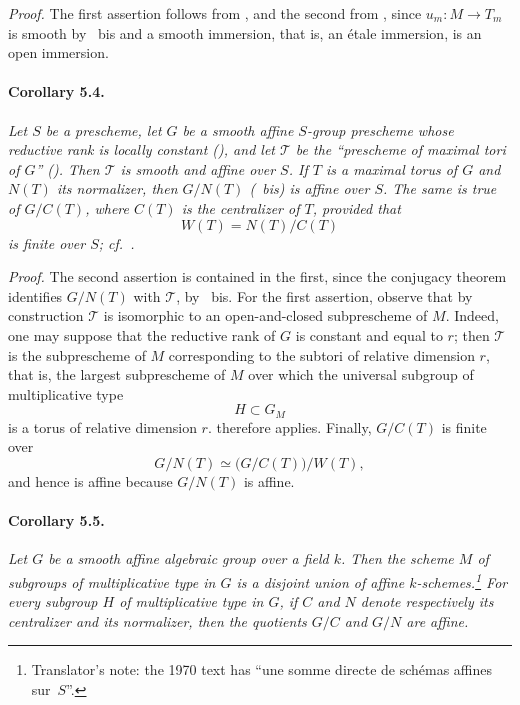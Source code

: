 \emph{Proof.}
The first assertion follows from , and the second from ,
since \(u_m:M\to T_m\) is smooth by ~bis and a smooth
immersion, that is, an étale immersion, is an open immersion.

\paragraph{\textbf{Corollary 5.4.}}
\emph{Let \(S\) be a prescheme, let \(G\) be a smooth affine
\(S\)-group prescheme whose reductive rank is locally constant
\textup{()}, and let \(\mathcal T\) be the ``prescheme of
maximal tori of \(G\)'' \textup{()}. Then \(\mathcal T\) is
smooth and affine over \(S\). If \(T\) is a maximal torus of \(G\)
and \(N(T)\) its normalizer, then \(G/N(T)\) \textup{(~bis)}
is affine over \(S\). The same is true of \(G/C(T)\), where \(C(T)\)
is the centralizer of \(T\), provided that
\[
  W(T)=N(T)/C(T)
\]
is finite over \(S\); cf.\ .}

\emph{Proof.}
The second assertion is contained in the first, since the conjugacy
theorem identifies \(G/N(T)\) with \(\mathcal T\), by ~bis.
For the first assertion, observe that by construction
\(\mathcal T\) is isomorphic to an open-and-closed subprescheme of
\(M\). Indeed, one may suppose that the reductive rank of \(G\) is
constant and equal to \(r\); then \(\mathcal T\) is the subprescheme
of \(M\) corresponding to the subtori of relative dimension \(r\),
that is, the largest subprescheme of \(M\) over which the universal
subgroup of multiplicative type
\[
  H\subset G_M
\]
is a torus of relative dimension \(r\).  therefore
applies. Finally, \(G/C(T)\) is finite over
\[
  G/N(T)\simeq \bigl(G/C(T)\bigr)/W(T),
\]
and hence is affine because \(G/N(T)\) is affine.

\paragraph{\textbf{Corollary 5.5.}}
\emph{Let \(G\) be a smooth affine algebraic group over a field
\(k\). Then the scheme \(M\) of subgroups of multiplicative type in
\(G\) is a disjoint union of affine \(k\)-schemes.\footnote{Translator's
note: the 1970 text has ``une somme directe de schémas affines
sur~\(S\)''.} For every
subgroup \(H\) of multiplicative type in \(G\), if \(C\) and \(N\)
denote respectively its centralizer and its normalizer, then the
quotients \(G/C\) and \(G/N\) are affine.}

